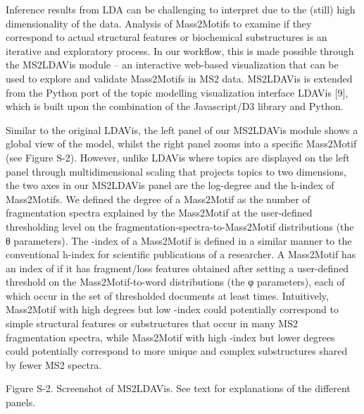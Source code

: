 Inference results from LDA can be challenging to interpret due to the (still) high dimensionality of the data. Analysis of Mass2Motifs to examine if they correspond to actual structural features or biochemical substructures is an iterative and exploratory process. In our workflow, this is made possible through the MS2LDAVis module -- an interactive web-based visualization that can be used to explore and validate Mass2Motifs in MS2 data. MS2LDAVis is extended from the Python port of the topic modelling visualization interface LDAVis [9], which is built upon the combination of the Javascript/D3 library and Python. 

Similar to the original LDAVis, the left panel of our MS2LDAVis module shows a global view of the model, whilst the right panel zooms into a specific Mass2Motif (see Figure S-2). However, unlike LDAVis where topics are displayed on the left panel through multidimensional scaling that projects topics to two dimensions, the two axes in our MS2LDAVis panel are the log-degree and the h-index of Mass2Motifs. We defined the degree of a Mass2Motif as the number of fragmentation spectra explained by the Mass2Motif at the user-defined thresholding level  on the fragmentation-spectra-to-Mass2Motif distributions (the θ parameters). The -index of a Mass2Motif is defined in a similar manner to the conventional h-index for scientific publications of a researcher. A Mass2Motif has an index of  if it has  fragment/loss features obtained after setting a user-defined threshold  on the Mass2Motif-to-word distributions (the φ parameters), each of which occur in the set of thresholded documents at least  times. Intuitively, Mass2Motif with high degrees but low -index could potentially correspond to simple structural features or substructures that occur in many MS2 fragmentation spectra, while Mass2Motif with high -index but lower degrees could potentially correspond to more unique and complex substructures shared by fewer MS2 spectra.

Figure S-2. Screenshot of MS2LDAVis. See text for explanations of the different panels.

